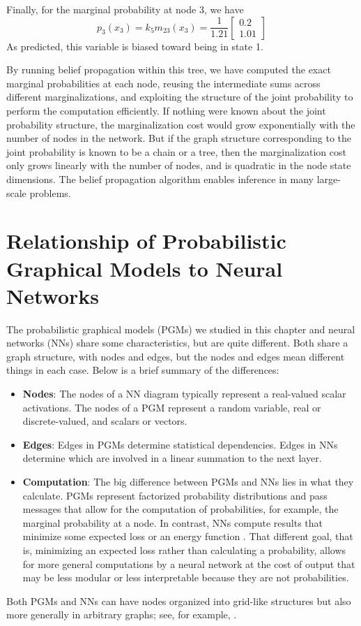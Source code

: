 Finally, for the marginal probability at node 3, we have
\begin{equation}
p_3(x_3) = k_5 m_{23}(x_3) 
=
\frac{1}{1.21}
\begin{bmatrix}
0.2 \\
1.01
\end{bmatrix}
\end{equation}
As predicted, this variable is biased toward being in state 1.

By running belief propagation within this tree, we have computed the
exact marginal probabilities at each node, reusing the intermediate
sums across different marginalizations, and exploiting the structure
of the joint probability to perform the computation efficiently.  If
nothing were known about the joint probability structure, the
marginalization cost would grow exponentially with the number of nodes
in the network.  But if the graph structure corresponding to the joint
probability is known to be a chain or a tree, then the marginalization
cost only grows linearly with the number of nodes, and is quadratic in
the node state dimensions.  The belief propagation algorithm enables inference in many large-scale problems.

\section{Relationship of Probabilistic Graphical Models to Neural Networks}

The probabilistic graphical models (PGMs) we studied in this chapter and neural networks (NNs) share some characteristics, but are quite different.  Both share a graph structure, with nodes and edges, but the nodes and edges mean different things in each case.  Below is a brief summary of the differences:

\begin{itemize}
    \item {\bf Nodes}: The nodes of a NN diagram typically represent a real-valued scalar activations.  The nodes of a PGM represent a random variable, real or discrete-valued, and scalars or vectors.
    \item {\bf Edges}:  Edges in PGMs determine statistical dependencies.  Edges in NNs determine which are involved in a linear summation to the next layer.
    \item {\bf Computation}:  The big difference between PGMs and NNs lies in what they calculate.  PGMs represent factorized probability distributions and pass messages that allow for the computation of  probabilities, for example, the marginal probability at a node. In contrast, NNs compute results that minimize some expected loss or an energy function \cite{LeCun2006,LeCun2007}.  That different goal, that is, minimizing an expected loss rather than calculating a probability, allows for more general computations by a neural network at the cost of output that may be less modular or less interpretable because they are not probabilities.
\end{itemize}
Both PGMs and NNs can have nodes organized into grid-like structures but also more generally in arbitrary graphs; see, for example, \cite{Gilmer2017,Kipf2017}.

